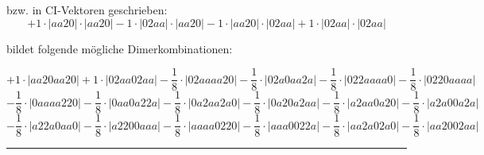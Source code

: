 \documentclass{article}
\begin{document}
\begin{minipage}{\linewidth}
bzw. in CI-Vektoren geschrieben: 
 $$+ 1 \cdot \left|aa20 \right| \cdot \left| aa20 \right| 
- 1 \cdot \left|02aa \right| \cdot \left| aa20 \right| 
- 1 \cdot \left|aa20 \right| \cdot \left| 02aa \right| 
+ 1 \cdot \left|02aa \right| \cdot \left| 02aa \right| 
$$



 bildet folgende mögliche Dimerkombinationen:

$$+ 1 \cdot \left|aa20aa20 \right| + 1 \cdot \left|02aa02aa \right| - \frac{1}{8} \cdot \left|02aaaa20 \right| - \frac{1}{8} \cdot \left|02a0aa2a \right| - \frac{1}{8} \cdot \left|022aaaa0 \right| - \frac{1}{8} \cdot \left|0220aaaa \right|  $$ $$ - \frac{1}{8} \cdot \left|0aaaa220 \right| - \frac{1}{8} \cdot \left|0aa0a22a \right| - \frac{1}{8} \cdot \left|0a2aa2a0 \right| - \frac{1}{8} \cdot \left|0a20a2aa \right| - \frac{1}{8} \cdot \left|a2aa0a20 \right| - \frac{1}{8} \cdot \left|a2a00a2a \right|  $$ $$ - \frac{1}{8} \cdot \left|a22a0aa0 \right| - \frac{1}{8} \cdot \left|a2200aaa \right| - \frac{1}{8} \cdot \left|aaaa0220 \right| - \frac{1}{8} \cdot \left|aaa0022a \right| - \frac{1}{8} \cdot \left|aa2a02a0 \right| - \frac{1}{8} \cdot \left|aa2002aa \right| $$



\end{minipage}
\vspace{0.5cm}
\hrule
\vspace{0.5cm}
\end{document}

